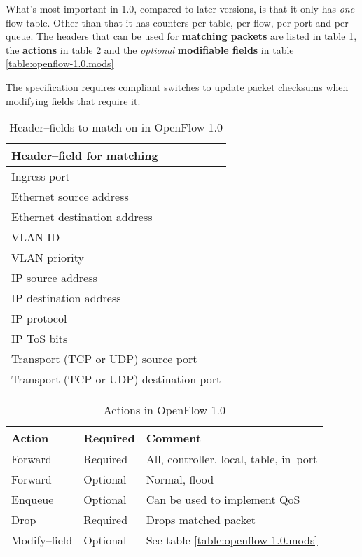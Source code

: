 What's most important in 1.0, compared to later versions, is that it only
has {\em one} flow table.  Other than that it has counters per table, per
flow, per port and per queue.  The headers that can be used for
\textbf{matching packets} are listed in table
\ref{table:openflow-1.0.headers}, the \textbf{actions} in table
\ref{table:openflow-1.0.actions} and the {\em optional} \textbf{modifiable
fields} in table \ref{table:openflow-1.0.mods}

The specification requires compliant switches to update packet checksums
when modifying fields that require it.

\begin{table}
\begin{tabular}{|l|}
\hline \textbf{Header--field for matching} \\
\hline Ingress port \\
\hline Ethernet source address \\
\hline Ethernet destination address \\
\hline VLAN ID \\
\hline VLAN priority \\
\hline IP source address \\
\hline IP destination address \\
\hline IP protocol \\
\hline IP \ac{ToS} bits \\
\hline Transport (TCP or UDP) source port \\
\hline Transport (TCP or UDP) destination port \\
\hline
\end{tabular}
\caption{Header--fields to match on in OpenFlow 1.0}
\label{table:openflow-1.0.headers}
\end{table}

\begin{table}
\begin{tabular}{|l|l|l|}
\hline \textbf{Action} &
       \textbf{Required} &
       \textbf{Comment} \\
\hline Forward & Required & All, controller, local, table, in--port \\
\hline Forward & Optional & Normal, flood \\
\hline Enqueue & Optional &  Can be used to implement \ac{QoS} \\
\hline Drop    & Required &  Drops matched packet \\
\hline Modify--field & Optional &  See table \ref{table:openflow-1.0.mods} \\
\hline
\end{tabular}
\caption{Actions in OpenFlow 1.0}
\label{table:openflow-1.0.actions}
\end{table}

